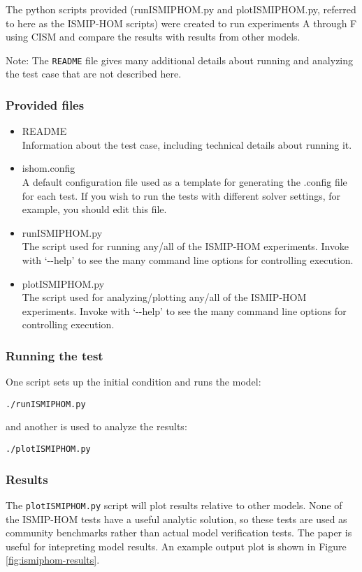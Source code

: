 The python scripts provided (runISMIPHOM.py and plotISMIPHOM.py, referred to here as the ISMIP-HOM 
scripts) were created to run experiments A through F using CISM and compare the results with results from other models. 

Note: The \texttt{README} file gives many additional details about running and analyzing the
test case that are not described here.

\subsubsection{Provided files}

\begin{itemize}
	\item README \\
		Information about the test case, including technical details about running it.
	\item ishom.config \\
		A default configuration file used as a template for generating the .config file for each test.
    		If you wish to run the tests with different solver settings, for example, you should edit this file.
	\item runISMIPHOM.py \\
		The script used for running any/all of the ISMIP-HOM experiments.  
    		Invoke with `-{}-help' to see the many command line options for controlling execution.
  \item plotISMIPHOM.py \\
		The script used for analyzing/plotting any/all of the ISMIP-HOM experiments.  
    		Invoke with `-{}-help' to see the many command line options for controlling execution.
\end{itemize}

\subsubsection{Running the test}
One script sets up the initial condition and runs the model:

\texttt{./runISMIPHOM.py}

\noindent
and another is used to analyze the results:

\texttt{./plotISMIPHOM.py}

\subsubsection{Results}
The \texttt{plotISMIPHOM.py} script will plot results relative to other models.
None of the ISMIP-HOM tests have a useful analytic solution, so these tests are
used as community benchmarks rather than actual model verification tests.
The \citet{Pattyn2008} paper is useful for intepreting model results.
An example output plot is shown in Figure \ref{fig:ismiphom-results}.

